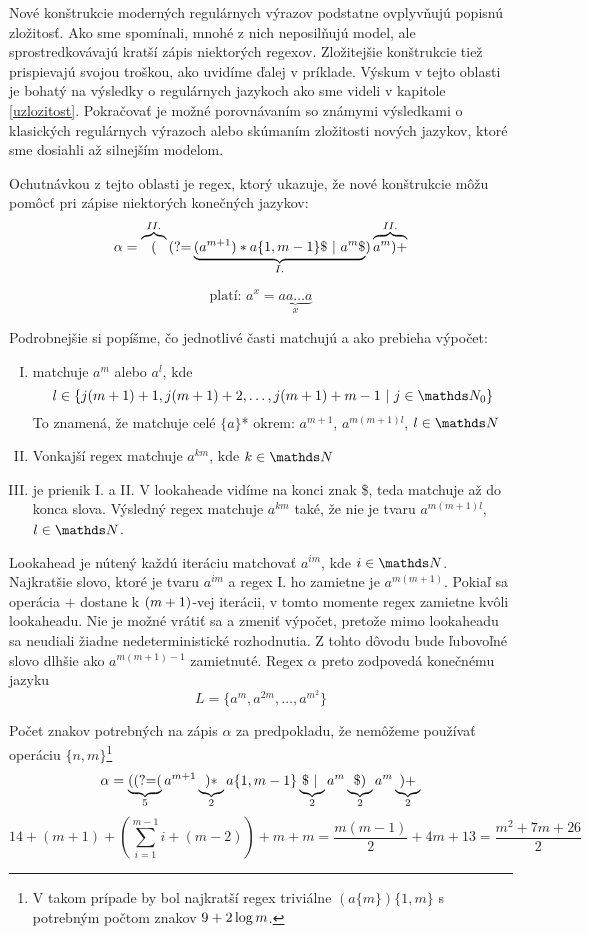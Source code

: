 Nové konštrukcie moderných regulárnych výrazov podstatne ovplyvňujú popisnú zložitosť. Ako sme spomínali, mnohé z nich neposilňujú model, ale sprostredkovávajú kratší zápis niektorých regexov. Zložitejšie konštrukcie tiež prispievajú svojou troškou, ako uvidíme ďalej v príklade. Výskum v tejto oblasti je bohatý na výsledky o regulárnych jazykoch ako sme videli v kapitole \ref{uzlozitost}. Pokračovať je možné porovnávaním so známymi výsledkami o klasických regulárnych výrazoch alebo skúmaním zložitosti nových jazykov, ktoré sme dosiahli až silnejším modelom.

Ochutnávkou z tejto oblasti je regex, ktorý ukazuje, že nové konštrukcie môžu pomôcť pri zápise niektorých konečných jazykov:
$$\alpha = 
\overbrace{(}^{II.}
\text{(?=} 
\underbrace{
	(a^{m+1})* a\lbrace 1,m-1\rbrace \$ ~|~ a^m \$ 
}_{ I. }
) 
\overbrace{
a^m)+
}^{ II. }
$$

$$\text{platí: } a^x = \underbrace{aa\dots a}_x$$

Podrobnejšie si popíšme, čo jednotlivé časti matchujú a ako prebieha výpočet:
\begin{enumerate}[I.]
\item matchuje $a^m$ alebo $a^l$, kde 
$$l\in\lbrace j(m+1)+1,j(m+1)+2,\dots,j(m+1)+m-1 ~|~j\in\N_0\rbrace$$
To znamená, že matchuje celé $\lbrace a\rbrace$* okrem: $a^{m+1}$, $a^{m(m+1)l}$, $l\in\N$
\item Vonkajší regex matchuje $a^{km}$, kde $k\in\N$
\item je prienik I. a II. V lookaheade vidíme na konci znak \$, teda matchuje až do konca slova. Výsledný regex matchuje $a^{km}$ také, že nie je tvaru $a^{m(m+1)l}$, $l\in\N$.
\end{enumerate}
Lookahead je nútený každú iteráciu matchovať $a^{im}$, kde $i\in\N$. Najkratšie slovo, ktoré je tvaru $a^{im}$ a regex I. ho zamietne je $a^{m(m+1)}$. Pokiaľ sa operácia $+$ dostane k $(m+\nobreak 1)$-vej iterácii, v tomto momente regex zamietne kvôli lookaheadu. Nie je možné vrátiť sa a zmeniť výpočet, pretože mimo lookaheadu sa neudiali žiadne nedeterministické rozhodnutia. Z tohto dôvodu bude ľubovoľné slovo dlhšie ako $a^{m(m+1)-1}$ zamietnuté. Regex $\alpha$ preto zodpovedá konečnému jazyku $$L = \lbrace a^m, a^{2m},\dots, a^{m^2} \rbrace$$

Počet znakov potrebných na zápis $\alpha$ za predpokladu, že nemôžeme používať operáciu $\{n,m\}$\footnote{V takom prípade by bol najkratší regex triviálne $(a\{m\})\{1,m\}$ s potrebným počtom znakov $9+\nobreak 2\log m$.} 
$$\alpha = 
\underbrace{
(\text{(?=} (
}_{5}
a^{m+1}
\underbrace{
)* 
}_{2}
a\{1,m-1\}
\underbrace{ 
 \$ ~|~  
}_{2}
a^m
\underbrace{ 
\$ ) 
}_{2}
a^m
\underbrace{ 
 )+
}_{2}
$$
$$14+ (m+1)+\left(\sum_{i=1}^{m-1} i+ (m-2)\right)+ m + m= \frac{m(m-1)}{2} + 4 m + 13 =\frac{ m^2 + 7m + 26}{2}$$

